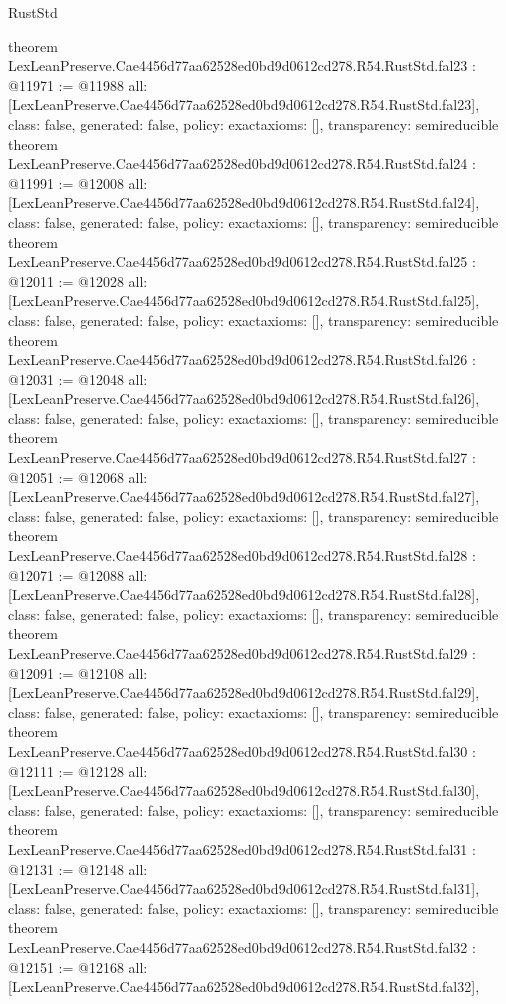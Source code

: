 \begin{lexlean}{RustStd}
\begin{coremodule}
{}
theorem LexLeanPreserve.Cae4456d77aa62528ed0bd9d0612cd278.R54.RustStd.fal23 : @11971 := @11988 {
  all: [LexLeanPreserve.Cae4456d77aa62528ed0bd9d0612cd278.R54.RustStd.fal23],
  class: false,
  generated: false,
  policy: exact{axioms: []},
  transparency: semireducible
}
theorem LexLeanPreserve.Cae4456d77aa62528ed0bd9d0612cd278.R54.RustStd.fal24 : @11991 := @12008 {
  all: [LexLeanPreserve.Cae4456d77aa62528ed0bd9d0612cd278.R54.RustStd.fal24],
  class: false,
  generated: false,
  policy: exact{axioms: []},
  transparency: semireducible
}
theorem LexLeanPreserve.Cae4456d77aa62528ed0bd9d0612cd278.R54.RustStd.fal25 : @12011 := @12028 {
  all: [LexLeanPreserve.Cae4456d77aa62528ed0bd9d0612cd278.R54.RustStd.fal25],
  class: false,
  generated: false,
  policy: exact{axioms: []},
  transparency: semireducible
}
theorem LexLeanPreserve.Cae4456d77aa62528ed0bd9d0612cd278.R54.RustStd.fal26 : @12031 := @12048 {
  all: [LexLeanPreserve.Cae4456d77aa62528ed0bd9d0612cd278.R54.RustStd.fal26],
  class: false,
  generated: false,
  policy: exact{axioms: []},
  transparency: semireducible
}
theorem LexLeanPreserve.Cae4456d77aa62528ed0bd9d0612cd278.R54.RustStd.fal27 : @12051 := @12068 {
  all: [LexLeanPreserve.Cae4456d77aa62528ed0bd9d0612cd278.R54.RustStd.fal27],
  class: false,
  generated: false,
  policy: exact{axioms: []},
  transparency: semireducible
}
theorem LexLeanPreserve.Cae4456d77aa62528ed0bd9d0612cd278.R54.RustStd.fal28 : @12071 := @12088 {
  all: [LexLeanPreserve.Cae4456d77aa62528ed0bd9d0612cd278.R54.RustStd.fal28],
  class: false,
  generated: false,
  policy: exact{axioms: []},
  transparency: semireducible
}
theorem LexLeanPreserve.Cae4456d77aa62528ed0bd9d0612cd278.R54.RustStd.fal29 : @12091 := @12108 {
  all: [LexLeanPreserve.Cae4456d77aa62528ed0bd9d0612cd278.R54.RustStd.fal29],
  class: false,
  generated: false,
  policy: exact{axioms: []},
  transparency: semireducible
}
theorem LexLeanPreserve.Cae4456d77aa62528ed0bd9d0612cd278.R54.RustStd.fal30 : @12111 := @12128 {
  all: [LexLeanPreserve.Cae4456d77aa62528ed0bd9d0612cd278.R54.RustStd.fal30],
  class: false,
  generated: false,
  policy: exact{axioms: []},
  transparency: semireducible
}
theorem LexLeanPreserve.Cae4456d77aa62528ed0bd9d0612cd278.R54.RustStd.fal31 : @12131 := @12148 {
  all: [LexLeanPreserve.Cae4456d77aa62528ed0bd9d0612cd278.R54.RustStd.fal31],
  class: false,
  generated: false,
  policy: exact{axioms: []},
  transparency: semireducible
}
theorem LexLeanPreserve.Cae4456d77aa62528ed0bd9d0612cd278.R54.RustStd.fal32 : @12151 := @12168 {
  all: [LexLeanPreserve.Cae4456d77aa62528ed0bd9d0612cd278.R54.RustStd.fal32],
}
\end{coremodule}
\end{lexlean}
